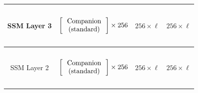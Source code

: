 \begin{table}[]
\begin{tabular}{@{}c|c|c|c@{}}
SSM Layer 3 & \begin{math}\begin{aligned}    \begin{matrix}    \text{\phantom{-}} \\    \end{matrix}    \\    \begin{bmatrix}    \text{\phantom{-} Companion \phantom{-}}   \\ \text{(standard)} \\    \end{bmatrix}    \times 256     \\    \begin{matrix}    \text{\phantom{-}} \\    \end{matrix}    \\\end{aligned}\end{math} & $256 \times \ell$                       & $256 \times \ell$                       \\ \midrule
SSM Layer 2 & \begin{math}\begin{aligned}    \begin{matrix}    \text{\phantom{-}} \\    \end{matrix}    \\    \begin{bmatrix}    \text{\phantom{-} Companion \phantom{-}}   \\ \text{(standard)} \\    \end{bmatrix}    \times 256     \\    \begin{matrix}    \text{\phantom{-}} \\    \end{matrix}    \\\end{aligned}\end{math} & $256 \times \ell$                       & $256 \times \ell$                       \\ \midrule

\end{tabular}
\end{table}
